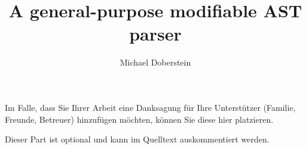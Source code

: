 \documentclass{hhuthesis}
\author{Michael Doberstein}
\title{A general-purpose modifiable AST parser}
\begin{document}
\frontmatter
\makefrontmatter

\begin{acknowledgements}
  Im Falle, dass Sie Ihrer Arbeit eine Danksagung für Ihre Unterstützer
  (Familie, Freunde, Betreuer)
  hinzufügen möchten, können Sie diese hier platzieren.

  Dieser Part ist optional und kann im Quelltext auskommentiert werden.
\end{acknowledgements}


\tableofcontents


\mainmatter




% 



\backmatter
\listoffigures
\listoftables

\clearpage

\end{document}
